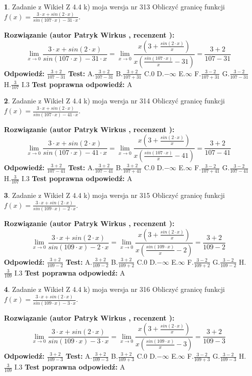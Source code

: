 \documentclass[12pt, a4paper]{article}
\theoremstyle{definition} %
\newtheorem{zad}{}
\newcommand{\zadStart}[1]{\begin{zad}#1\newline}
\newcommand{\zadStop}{\end{zad}}
\newcommand{\rozwStart}[2]{\noindent \textbf{Rozwiązanie (autor #1 , recenzent #2): }\newline}
\newcommand{\rozwStop}{\newline}
\newcommand{\odpStart}{\noindent \textbf{Odpowiedź:}\newline}
\newcommand{\odpStop}{\newline}
\newcommand{\testStart}{\noindent \textbf{Test:}\newline}
\newcommand{\testStop}{\newline}
\newcommand{\kluczStart}{\noindent \textbf{Test poprawna odpowiedź:}\newline}
\newcommand{\kluczStop}{\newline}
\begin{document}
\zadStart{Zadanie z Wikieł Z 4.4 k) moja wersja nr 313}
Obliczyć granicę funkcji $f(x)=\frac{3\cdot x +sin(2\cdot x)}{sin(107\cdot x) -31\cdot x}$.
\zadStop
\rozwStart{Patryk Wirkus}{}
$$\lim\limits_{x\to 0}\frac{3\cdot x +sin(2\cdot x)}{sin(107\cdot x) -31\cdot x}
=\lim\limits_{x\to 0}\frac{x(3+\frac{sin(2\cdot x)}{x})}{x(\frac{sin(107\cdot x)}{x}-31)}
=\frac{3+2}{107-31}$$
\rozwStop
\odpStart
$\frac{3+2}{107-31}$
\odpStop
\testStart
A.$\frac{3+2}{107-31}$
B.$\frac{3+2}{107+31}$
C.$0$
D.$-\infty$
E.$\infty$
F.$\frac{3-2}{107+31}$
G.$\frac{3-2}{107-31}$
H.$\frac{3}{107}$
I.$3$
\testStop
\kluczStart
A
\kluczStop



\zadStart{Zadanie z Wikieł Z 4.4 k) moja wersja nr 314}
Obliczyć granicę funkcji $f(x)=\frac{3\cdot x +sin(2\cdot x)}{sin(107\cdot x) -41\cdot x}$.
\zadStop
\rozwStart{Patryk Wirkus}{}
$$\lim\limits_{x\to 0}\frac{3\cdot x +sin(2\cdot x)}{sin(107\cdot x) -41\cdot x}
=\lim\limits_{x\to 0}\frac{x(3+\frac{sin(2\cdot x)}{x})}{x(\frac{sin(107\cdot x)}{x}-41)}
=\frac{3+2}{107-41}$$
\rozwStop
\odpStart
$\frac{3+2}{107-41}$
\odpStop
\testStart
A.$\frac{3+2}{107-41}$
B.$\frac{3+2}{107+41}$
C.$0$
D.$-\infty$
E.$\infty$
F.$\frac{3-2}{107+41}$
G.$\frac{3-2}{107-41}$
H.$\frac{3}{107}$
I.$3$
\testStop
\kluczStart
A
\kluczStop



\zadStart{Zadanie z Wikieł Z 4.4 k) moja wersja nr 315}
Obliczyć granicę funkcji $f(x)=\frac{3\cdot x +sin(2\cdot x)}{sin(109\cdot x) -2\cdot x}$.
\zadStop
\rozwStart{Patryk Wirkus}{}
$$\lim\limits_{x\to 0}\frac{3\cdot x +sin(2\cdot x)}{sin(109\cdot x) -2\cdot x}
=\lim\limits_{x\to 0}\frac{x(3+\frac{sin(2\cdot x)}{x})}{x(\frac{sin(109\cdot x)}{x}-2)}
=\frac{3+2}{109-2}$$
\rozwStop
\odpStart
$\frac{3+2}{109-2}$
\odpStop
\testStart
A.$\frac{3+2}{109-2}$
B.$\frac{3+2}{109+2}$
C.$0$
D.$-\infty$
E.$\infty$
F.$\frac{3-2}{109+2}$
G.$\frac{3-2}{109-2}$
H.$\frac{3}{109}$
I.$3$
\testStop
\kluczStart
A
\kluczStop



\zadStart{Zadanie z Wikieł Z 4.4 k) moja wersja nr 316}
Obliczyć granicę funkcji $f(x)=\frac{3\cdot x +sin(2\cdot x)}{sin(109\cdot x) -3\cdot x}$.
\zadStop
\rozwStart{Patryk Wirkus}{}
$$\lim\limits_{x\to 0}\frac{3\cdot x +sin(2\cdot x)}{sin(109\cdot x) -3\cdot x}
=\lim\limits_{x\to 0}\frac{x(3+\frac{sin(2\cdot x)}{x})}{x(\frac{sin(109\cdot x)}{x}-3)}
=\frac{3+2}{109-3}$$
\rozwStop
\odpStart
$\frac{3+2}{109-3}$
\odpStop
\testStart
A.$\frac{3+2}{109-3}$
B.$\frac{3+2}{109+3}$
C.$0$
D.$-\infty$
E.$\infty$
F.$\frac{3-2}{109+3}$
G.$\frac{3-2}{109-3}$
H.$\frac{3}{109}$
I.$3$
\testStop
\kluczStart
A
\kluczStop
\end{document}
